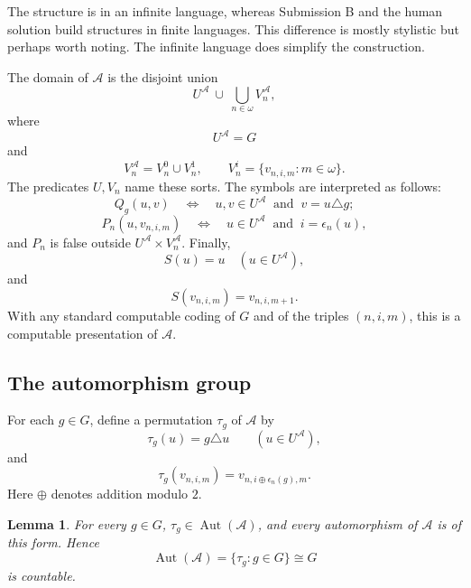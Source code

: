 \documentclass[12pt]{article}
\newtheorem{lemma}{Lemma}
\newcommand{\Aut}{\operatorname{Aut}}
\newcommand{\review}[1]{\begin{reviewbox}#1\end{reviewbox}}
\begin{document}
\review{The structure is in an infinite language, whereas Submission B and the human solution build structures in finite languages. This difference is mostly stylistic but perhaps worth noting. The infinite language does simplify the construction.}

The domain of $\mathcal A$ is the disjoint union
\[
U^{\mathcal A}\ \cup\ \bigcup_{n\in\omega}V_n^{\mathcal A},
\]
where
\[
U^{\mathcal A}=G
\]
and
\[
V_n^{\mathcal A}=V_n^0\cup V_n^1,\qquad
V_n^i=\{v_{n,i,m}:m\in\omega\}.
\]
The predicates $U,V_n$ name these sorts.  The symbols are interpreted as follows:
\[
Q_g(u,v)\quad\Longleftrightarrow\quad u,v\in U^{\mathcal A}
\ \text{ and }\ v=u\triangle g;
\]
\[
P_n(u,v_{n,i,m})\quad\Longleftrightarrow\quad
u\in U^{\mathcal A}\ \text{ and }\ i=\epsilon_n(u),
\]
and $P_n$ is false outside $U^{\mathcal A}\times V_n^{\mathcal A}$.  Finally,
\[
S(u)=u\quad(u\in U^{\mathcal A}),
\]
and
\[
S(v_{n,i,m})=v_{n,i,m+1}.
\]
With any standard computable coding of $G$ and of the triples $(n,i,m)$, this is a computable presentation of $\mathcal A$.

\subsection*{The automorphism group}

For each $g\in G$, define a permutation $\tau_g$ of $\mathcal A$ by
\[
\tau_g(u)=g\triangle u\qquad(u\in U^{\mathcal A}),
\]
and
\[
\tau_g(v_{n,i,m})=v_{n,i\oplus \epsilon_n(g),m}.
\]
Here $\oplus$ denotes addition modulo $2$.

\begin{lemma}
For every $g\in G$, $\tau_g\in\Aut(\mathcal A)$, and every automorphism of
$\mathcal A$ is of this form.  Hence
\[
\Aut(\mathcal A)=\{\tau_g:g\in G\}\cong G
\]
is countable.
\end{lemma}
\end{document}
